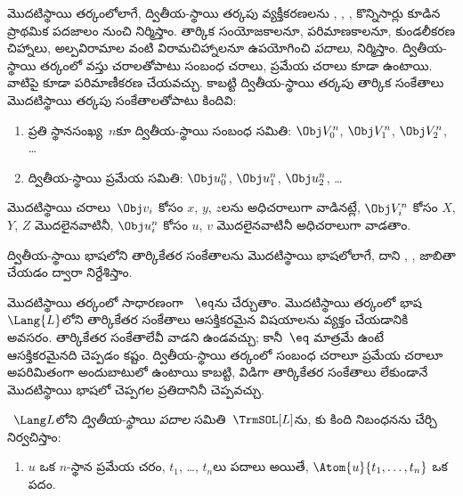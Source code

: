 \documentclass[../../../include/open-logic-section]{subfiles}
\begin{document}


మొదటిస్థాయి తర్కంలోలాగే, ద్వితీయ-స్థాయి తర్కపు వ్యక్తీకరణలను
\emph{}, \emph{}, \emph{},
కొన్నిసార్లు \emph{} కూడిన ప్రాథమిక పదజాలం నుంచి
నిర్మిస్తాం. తార్కిక సంయోజకాలనూ, పరిమాణకాలనూ, కుండలీకరణ
చిహ్నాలు, అల్పవిరామాల వంటి విరామచిహ్నాలనూ ఉపయోగించి \emph{పదాలు},
\emph{} నిర్మిస్తాం. ద్వితీయ-స్థాయి తర్కంలో వస్తు చరాలతోపాటు సంబంధ చరాలు,
ప్రమేయ చరాలు కూడా ఉంటాయి. వాటిపై కూడా పరిమాణీకరణ చేయవచ్చు. కాబట్టి ద్వితీయ-స్థాయి తర్కపు తార్కిక సంకేతాలు
మొదటిస్థాయి తర్కపు సంకేతాలతోపాటు కిందివి:

\begin{enumerate}
\item ప్రతి స్థానసంఖ్య~$n$కూ ద్వితీయ-స్థాయి సంబంధ
    సమితి: $\Obj V_0^n$,
  $\Obj V_1^n$, $\Obj V_2^n$, \dots
\item ద్వితీయ-స్థాయి ప్రమేయ 
   సమితి: $\Obj u_0^n$, $\Obj u_1^n$,
  $\Obj u_2^n$, \dots
\end{enumerate}

మొదటిస్థాయి చరాలు~$\Obj v_i$ కోసం $x$, $y$, $z$లను అధిచరాలుగా
వాడినట్లే, $\Obj V_i^n$ కోసం $X$, $Y$, $Z$ మొదలైనవాటినీ,
$\Obj u_i^n$ కోసం $u$, $v$ మొదలైనవాటినీ అధిచరాలుగా వాడతాం.

\begin{explain}
ద్వితీయ-స్థాయి భాషలోని తార్కికేతర సంకేతాలను మొదటిస్థాయి భాషలోలాగే,
దాని , ,  జాబితా
చేయడం ద్వారా నిర్దేశిస్తాం.

మొదటిస్థాయి తర్కంలో సాధారణంగా ~$\eq$ను చేర్చుతాం.
మొదటిస్థాయి తర్కంలో భాష~$\Lang{L}$లోని తార్కికేతర సంకేతాలు
ఆసక్తికరమైన విషయాలను వ్యక్తం చేయడానికి అవసరం. తార్కికేతర సంకేతాలేవీ
వాడని  ఉండవచ్చు; కానీ~$\eq$ మాత్రమే ఉంటే ఆసక్తికరమైనది
చెప్పడం కష్టం. ద్వితీయ-స్థాయి తర్కంలో సంబంధ చరాలూ ప్రమేయ చరాలూ అపరిమితంగా
అందుబాటులో ఉంటాయి కాబట్టి, విడిగా తార్కికేతర సంకేతాలు లేకుండానే
మొదటిస్థాయి భాషలో చెప్పగల ప్రతిదానినీ చెప్పవచ్చు.
\end{explain}

\begin{defn}[ద్వితీయ-స్థాయి పదాలు]
~$\Lang L$లోని \emph{ద్వితీయ-స్థాయి పదాల} సమితి~$\TrmSOL[L]$ను,
కు కింది నిబంధనను చేర్చి నిర్వచిస్తాం:
\begin{enumerate}
\item $u$ ఒక $n$-స్థాన ప్రమేయ చరం, $t_1$, \dots, $t_n$లు పదాలు
  అయితే, $\Atom{u}{t_1, \ldots, t_n}$ ఒక పదం.
\end{enumerate}
\end{defn}
\end{document}
